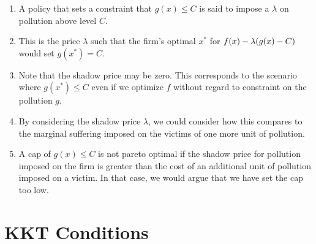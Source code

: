 \documentclass[11pt, oneside]{amsart}
\begin{document}
\begin{enumerate}
  \item A policy that sets a constraint that $g(x) \leq C$ is said to
  impose a  $\lambda$ on pollution above level $C$.

  \item This is the price $\lambda$ such that the firm's optimal $x^*$
  for $f(x) - \lambda \mathopen{}\left( {g(x) - C} \right)\mathclose{}$ would set $g(x^*) = C$.

  \item Note that the shadow price may be zero. This corresponds to the
  scenario where $g(x^*) \leq C$ even if we optimize $f$ without regard
  to constraint on the pollution $g$.

  \item By considering the shadow price $\lambda$, we could consider how
  this compares to the marginal suffering imposed on the victims of one
  more unit of pollution.

  \item A cap of $g(x) \leq C$ is not pareto optimal if the shadow price
  for pollution imposed on the firm is greater than the cost of an
  additional unit of pollution imposed on a victim. In that case, we
  would argue that we have set the cap too low.
\end{enumerate}

\section{KKT Conditions}
\end{document}
